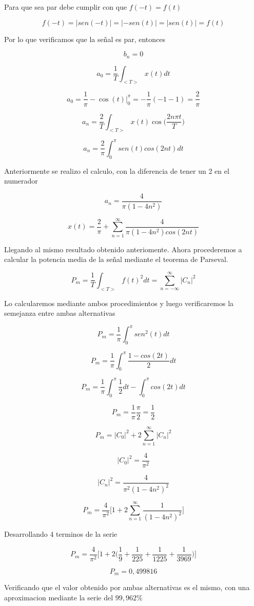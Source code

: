 Para que sea par debe cumplir con que $f(-t) = f(t)$

$$f(-t) = |sen(-t)| = |-sen(t)| = |sen(t)| = f(t) $$

Por lo que verificamos que la se\~nal es par, entonces

$$b_n = 0 $$

$$a_0 = \dfrac{1}{T} \int_{<T>} x(t) dt $$

$$a_0 = \dfrac{1}{\pi} -\cos (t) \bigg\rvert_{0}^{\pi} = -\dfrac{1}{\pi} (-1-1) = \dfrac{2}{\pi} $$

$$a_n = \dfrac{2}{T} \int_{<T>} x(t) \cos \bigg(\dfrac{2n\pi t}{T} \bigg) $$

$$a_n = \dfrac{2}{\pi} \int_{0}^{\pi} sen(t) cos(2nt) dt $$

Anteriormente se realizo el calculo, con la diferencia de tener un 2 en el numerador

$$a_n = \dfrac{4}{\pi(1-4n^2)} $$

\[x(t) = \dfrac{2}{\pi} + \sum_{n=1}^{\infty} \dfrac{4}{\pi(1-4n^2) cos(2nt)} \]

Llegando al mismo resultado obtenido anteriomente. Ahora procederemos a calcular la potencia media de la se\~nal mediante el teorema de Parseval.

\[P_m = \dfrac{1}{T} \int_{<T>} f(t)^2 dt = \sum_{n=-\infty}^{\infty} |C_n|^2 \]

Lo calcularemos mediante ambos procedimientos y luego verificaremos la semejanza entre ambas alternativas

$$P_m = \dfrac{1}{\pi} \int_{0}^{\pi} sen^2 (t) dt $$

$$P_m = \dfrac{1}{\pi} \int_{0}^{\pi} \dfrac{1-cos(2t)}{2} dt$$

$$P_m = \dfrac{1}{\pi} \int_{0}^{\pi} \dfrac{1}{2} dt - \int_{0}^{\pi} cos(2t) dt $$

$$P_m = \dfrac{1}{\pi} \dfrac{\pi}{2} = \dfrac{1}{2} $$

\[P_m = |C_0|^2 + 2 \sum_{n=1}^{\infty} |C_n|^2 \]

$$|C_0|^2 = \dfrac{4}{\pi^2} $$

$$|C_n|^2 = \dfrac{4}{\pi^2(1-4n^2)^2} $$

\[P_m = \dfrac{4}{\pi^2} \bigg[1 + 2\sum_{n=1}^{\infty} \dfrac{1}{(1-4n^2)^2} \bigg] \]

Desarrollando 4 terminos de la serie

\[P_m = \dfrac{4}{\pi^2} \bigg[1 + 2 \bigg(\dfrac{1}{9} + \dfrac{1}{225} + \dfrac{1}{1225} + \dfrac{1}{3969} \bigg) \bigg] \]

$$P_m = 0,499816 $$

Verificando que el valor obtenido por ambas alternativas es el mismo, con una aproximacion mediante la serie del $99,962\percent$

